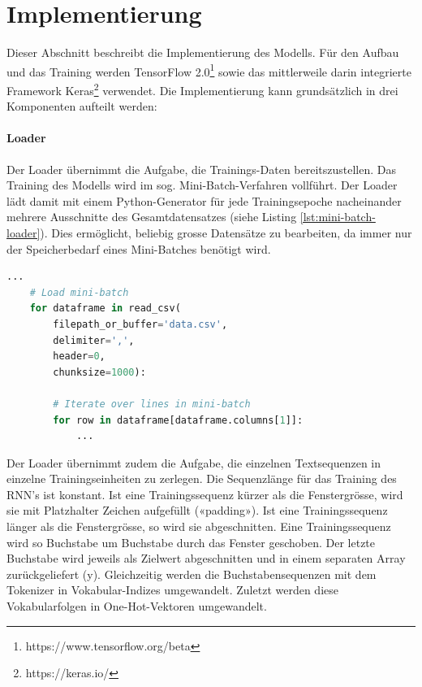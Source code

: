 \section{Implementierung}
\label{sec:model-implementation}

Dieser Abschnitt beschreibt die Implementierung des Modells.
Für den Aufbau und das Training werden TensorFlow 2.0\footnote{https://www.tensorflow.org/beta} sowie das mittlerweile darin integrierte Framework Keras\footnote{https://keras.io/} verwendet.
Die Implementierung kann grundsätzlich in drei Komponenten aufteilt werden:

\paragraph{Loader} Der Loader übernimmt die Aufgabe, die Trainings-Daten bereitszustellen.
Das Training des Modells wird im sog. Mini-Batch-Verfahren vollführt.
Der Loader lädt damit mit einem Python-Generator für jede Trainingsepoche nacheinander mehrere Ausschnitte des Gesamtdatensatzes (siehe Listing \ref{lst:mini-batch-loader}).
Dies ermöglicht, beliebig grosse Datensätze zu bearbeiten, da immer nur der Speicherbedarf eines Mini-Batches benötigt wird.

\begin{lstlisting}[language=Python, caption=Mini-Batch Loader, label=lst:mini-batch-loader]
    ...
    # Load mini-batch
    for dataframe in read_csv(
        filepath_or_buffer='data.csv',
        delimiter=',',
        header=0,
        chunksize=1000):

        # Iterate over lines in mini-batch
        for row in dataframe[dataframe.columns[1]]:
            ...
\end{lstlisting}

Der Loader übernimmt zudem die Aufgabe, die einzelnen Textsequenzen in einzelne Trainingseinheiten zu zerlegen.
Die Sequenzlänge für das Training des RNN's ist konstant.
Ist eine Trainingssequenz kürzer als die Fenstergrösse, wird sie mit Platzhalter Zeichen aufgefüllt («padding»).
Ist eine Trainingssequenz länger als die Fenstergrösse, so wird sie abgeschnitten.
Eine Trainingssequenz wird so Buchstabe um Buchstabe durch das Fenster geschoben.
Der letzte Buchstabe wird jeweils als Zielwert abgeschnitten und in einem separaten Array zurückgeliefert (y).
Gleichzeitig werden die Buchstabensequenzen mit dem Tokenizer in Vokabular-Indizes umgewandelt.
Zuletzt werden diese Vokabularfolgen in One-Hot-Vektoren umgewandelt.

